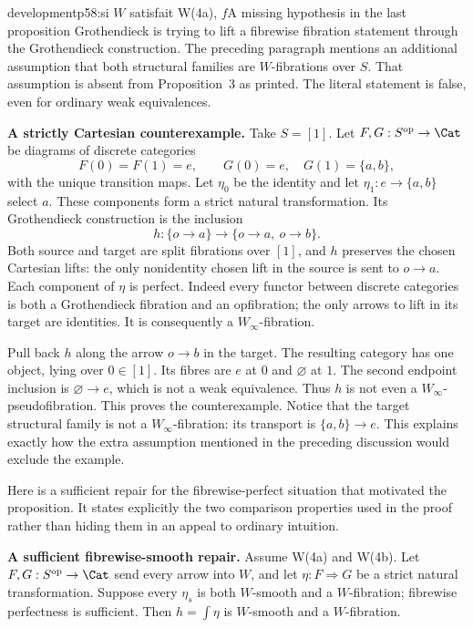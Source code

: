 \begin{dcomment}{development}{p58:si $W$ satisfait W(4a), $f$}{A missing hypothesis in the last proposition}
Grothendieck is trying to lift a fibrewise fibration statement through the Grothendieck construction. The preceding paragraph mentions an additional assumption that both structural families are $W$-fibrations over $S$. That assumption is absent from Proposition~3 as printed. The literal statement is false, even for ordinary weak equivalences.

\textbf{A strictly Cartesian counterexample.}\ours\quad
Take $S=[1]$. Let $F,G:S^{\mathrm{op}}\to\Cat$ be diagrams of discrete categories
\[
 F(0)=F(1)=e,\qquad
 G(0)=e,\quad G(1)=\{a,b\},
\]
with the unique transition maps. Let $\eta_0$ be the identity and let $\eta_1:e\to\{a,b\}$ select $a$. These components form a strict natural transformation. Its Grothendieck construction is the inclusion
\[
 h:\{o\to a\}\longrightarrow\{o\to a,\ o\to b\}.
\]
Both source and target are split fibrations over $[1]$, and $h$ preserves the chosen Cartesian lifts: the only nonidentity chosen lift in the source is sent to $o\to a$. Each component of $\eta$ is perfect. Indeed every functor between discrete categories is both a Grothendieck fibration and an opfibration; the only arrows to lift in its target are identities. It is consequently a $W_\infty$-fibration.

Pull back $h$ along the arrow $o\to b$ in the target. The resulting category has one object, lying over $0\in[1]$. Its fibres are $e$ at $0$ and $\varnothing$ at $1$. The second endpoint inclusion is $\varnothing\to e$, which is not a weak equivalence. Thus $h$ is not even a $W_\infty$-pseudofibration. This proves the counterexample. Notice that the target structural family is not a $W_\infty$-fibration: its transport is $\{a,b\}\to e$. This explains exactly how the extra assumption mentioned in the preceding discussion would exclude the example.

Here is a sufficient repair for the fibrewise-perfect situation that motivated the proposition. It states explicitly the two comparison properties used in the proof rather than hiding them in an appeal to ordinary intuition.

\textbf{A sufficient fibrewise-smooth repair.}\ours\quad
Assume W(4a) and W(4b). Let $F,G:S^{\mathrm{op}}\to\Cat$ send every arrow into $W$, and let $\eta:F\Rightarrow G$ be a strict natural transformation. Suppose every $\eta_s$ is both $W$-smooth and a $W$-fibration; fibrewise perfectness is sufficient. Then $h=\int\eta$ is $W$-smooth and a $W$-fibration.


\end{dcomment}
